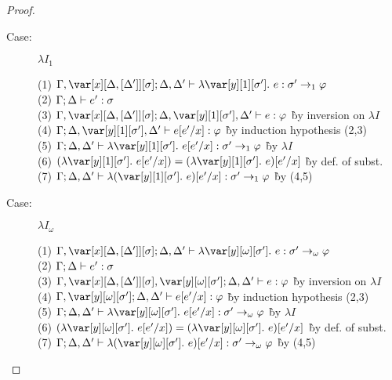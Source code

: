 \begin{proof}
\begin{description}
\item[Case:] $\lambda I_1$
\begin{tabbing}
    (1) $\G, \xD; \D, \D' \vdash \lambda \y[1][\s'].~e : \s' \to_1 \vp$\\
    (2) $\Gamma; \Delta \vdash e' : \sigma$\\
    (3) $\G, \xD; \D, \y[1][\s'], \D' \vdash e : \vp$ \` by inversion on $\lambda I$\\
    (4) $\G; \D, \y[1][\s'], \D' \vdash e[e'/x] : \vp$ \` by induction hypothesis (2,3)\\
    (5) $\G; \D, \D' \vdash \lambda \y[1][\s'].~e[e'/x] : \s' \to_1 \vp$ \` by $\lambda I$\\
    (6) $(\lambda \y[1][\s'].~e[e'/x]) = (\lambda \y[1][\s'].~e)[e'/x]$ \` by def. of subst.\\
    (7) $\G; \D, \D' \vdash \lambda (\y[1][\s'].~e)[e'/x] : \s' \to_1 \vp$ \` by (4,5)\\
\end{tabbing}

\item[Case:] $\lambda I_\omega$
\begin{tabbing}
    (1) $\G, \xD; \D, \D' \vdash \lambda \y[\omega][\s'].~e : \s' \to_\omega \vp$\\
    (2) $\Gamma; \Delta \vdash e' : \sigma$\\
    (3) $\G, \xD, \y[\omega][\s']; \D, \D' \vdash e : \vp$ \` by inversion on $\lambda I$\\
    (4) $\G, \y[\omega][\s']; \D, \D' \vdash e[e'/x] : \vp$ \` by induction hypothesis (2,3)\\
    (5) $\G; \D, \D' \vdash \lambda \y[\omega][\s'].~e[e'/x] : \s' \to_\omega \vp$ \` by $\lambda I$\\
    (6) $(\lambda \y[\omega][\s'].~e[e'/x]) = (\lambda \y[\omega][\s'].~e)[e'/x]$ \` by def. of subst.\\
    (7) $\G; \D, \D' \vdash \lambda (\y[\omega][\s'].~e)[e'/x] : \s' \to_\omega \vp$ \` by (4,5)\\
\end{tabbing}


\end{description}
\end{proof}
